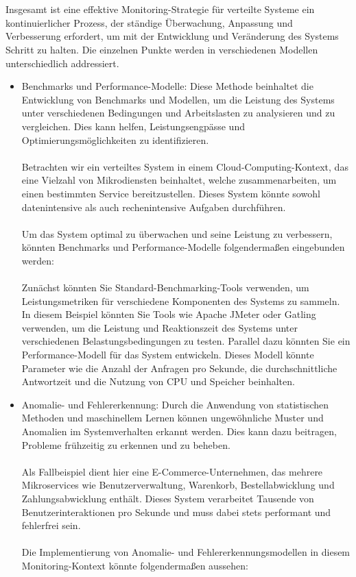 \\\\
Insgesamt ist eine effektive Monitoring-Strategie für verteilte Systeme ein kontinuierlicher Prozess, der ständige Überwachung, Anpassung und Verbesserung erfordert, um mit der Entwicklung und Veränderung des Systems Schritt zu halten. Die einzelnen Punkte werden in verschiedenen Modellen unterschiedlich addressiert. 
\begin{itemize}
\item Benchmarks und Performance-Modelle: Diese Methode beinhaltet die Entwicklung von Benchmarks und Modellen, um die Leistung des Systems unter verschiedenen Bedingungen und Arbeitslasten zu analysieren und zu vergleichen. Dies kann helfen, Leistungsengpässe und Optimierungsmöglichkeiten zu identifizieren.
\\\\
Betrachten wir ein verteiltes System in einem Cloud-Computing-Kontext, das eine Vielzahl von Mikrodiensten beinhaltet, welche zusammenarbeiten, um einen bestimmten Service bereitzustellen. Dieses System könnte sowohl datenintensive als auch rechenintensive Aufgaben durchführen.
\\\\
Um das System optimal zu überwachen und seine Leistung zu verbessern, könnten Benchmarks und Performance-Modelle folgendermaßen eingebunden werden:
\\\\
Zunächst könnten Sie Standard-Benchmarking-Tools verwenden, um Leistungsmetriken für verschiedene Komponenten des Systems zu sammeln. In diesem Beispiel könnten Sie Tools wie Apache JMeter oder Gatling verwenden, um die Leistung und Reaktionszeit des Systems unter verschiedenen Belastungsbedingungen zu testen.
Parallel dazu könnten Sie ein Performance-Modell für das System entwickeln. Dieses Modell könnte Parameter wie die Anzahl der Anfragen pro Sekunde, die durchschnittliche Antwortzeit und die Nutzung von CPU und Speicher beinhalten.

\item Anomalie- und Fehlererkennung: Durch die Anwendung von statistischen Methoden und maschinellem Lernen können ungewöhnliche Muster und Anomalien im Systemverhalten erkannt werden. Dies kann dazu beitragen, Probleme frühzeitig zu erkennen und zu beheben.
\\\\
Als Fallbeispiel dient hier eine E-Commerce-Unternehmen, das mehrere Mikroservices wie Benutzerverwaltung, Warenkorb, Bestellabwicklung und Zahlungsabwicklung enthält. Dieses System verarbeitet Tausende von Benutzerinteraktionen pro Sekunde und muss dabei stets performant und fehlerfrei sein.
\\\\
Die Implementierung von Anomalie- und Fehlererkennungsmodellen in diesem Monitoring-Kontext könnte folgendermaßen aussehen:


\end{itemize}
